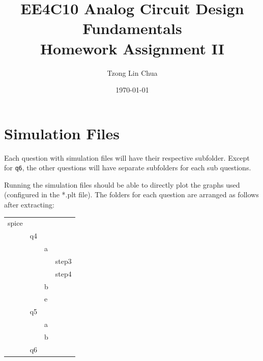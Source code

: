 \documentclass{article}
\author{Tzong Lin Chua}
\date{\today}
\title{EE4C10 Analog Circuit Design Fundamentals\\\medskip
\large Homework Assignment II }
\begin{document}
\maketitle
\tableofcontents


\section{Simulation Files}
\label{sec:orgdca3fab}
Each question with simulation files will have their respective subfolder.
Except for \texttt{q6}, the other questions will have separate subfolders for each sub questions.

Running the simulation files should be able to directly plot the graphs used (configured in the *.plt file).
The folders for each question are arranged as follows after extracting:

\begin{center}
\begin{tabular}{llll}
\hline
spice &  &  & \\
 & q4 &  & \\
 &  & a & \\
 &  &  & step3\\
 &  &  & step4\\
 &  & b & \\
 &  & e & \\
 & q5 &  & \\
 &  & a & \\
 &  & b & \\
 & q6 &  & \\
\hline
\end{tabular}
\end{center}
\end{document}

